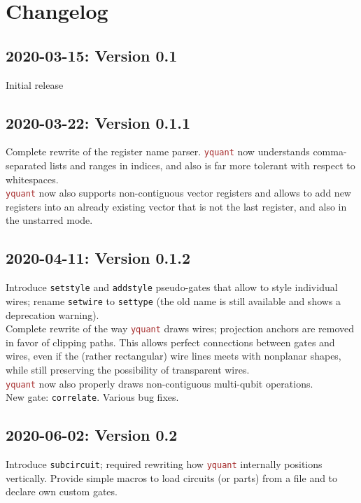 \documentclass{scrartcl}
\makeatletter
\def\pkg#1{\textcolor{brown}{\texttt{#1}}}
\def\ttlink{\link\texttt}
\def\Yquant{\pkg{yquant}}
\newcommand*{\the@orig@section}{}
\let\the@orig@section=\section
\renewcommand*{\section}{%
   \clearpage%
   \the@orig@section%
}
\makeatother
\begin{document}
   \section{Changelog}
      \subsection*{2020-03-15: Version 0.1}
         Initial release

      \subsection*{2020-03-22: Version 0.1.1}
         Complete rewrite of the register name parser.
         \Yquant{} now understands comma\hyp separated lists and ranges in indices, and also is far more tolerant with respect to whitespaces. \\
         \Yquant{} now also supports non\hyp contiguous vector registers and allows to add new registers into an already existing vector that is not the last register, and also in the unstarred mode.

      \subsection*{2020-04-11: Version 0.1.2}
         Introduce \ttlink{setstyle} and \ttlink{addstyle} pseudo\hyp gates that allow to style individual wires; rename \ttlink{setwire} to \ttlink{settype} (the old name is still available and shows a deprecation warning). \\
         Complete rewrite of the way \Yquant{} draws wires; projection anchors are removed in favor of clipping paths.
         This allows perfect connections between gates and wires, even if the (rather rectangular) wire lines meets with nonplanar shapes, while still preserving the possibility of transparent wires. \\
         \Yquant{} now also properly draws non\hyp contiguous multi\hyp qubit operations. \\
         New gate: \ttlink{correlate}.
         Various bug fixes.

      \subsection*{2020-06-02: Version 0.2}
         Introduce \ttlink{subcircuit}; required rewriting how \Yquant{} internally positions vertically.
         Provide simple macros to load circuits (or parts) from a file and to declare own custom gates.
\end{document}
